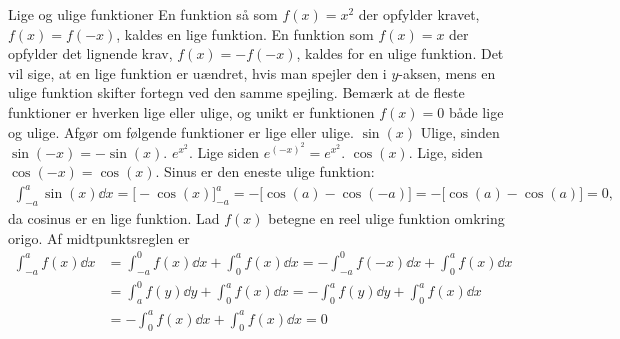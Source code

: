 \begin{opgave}[3]{Lige og ulige funktioner}
En funktion så som $f(x) = x^2$ der opfylder kravet, $f(x) = f(-x)$, kaldes en lige funktion. En funktion som $f(x) = x$ der opfylder det lignende krav, $f(x)=-f(-x)$, kaldes for en ulige funktion.
Det vil sige, at en lige funktion er uændret, hvis man spejler den i $y$-aksen, mens en ulige funktion skifter fortegn ved den samme spejling.
Bemærk at de fleste funktioner er hverken lige eller ulige, og unikt er funktionen $f(x) = 0$ både lige og ulige.
Afgør om følgende funktioner er lige eller ulige.
\opg $\sin(x)$
Ulige, sinden $\sin(-x)=-\sin(x)$.
\opg $e^{x^2}$.
Lige siden $e^{(-x)^2}=e^{x^2}$.
\opg $\cos(x)$.
Lige, siden $\cos(-x)=\cos(x)$.
\opg Sinus er den eneste ulige funktion:
%
\begin{align*}
    \int_{-a}^{a}\sin(x)\dd{x} = \Big[-\cos(x)\Big]_{-a}^{a} = -\Big[\cos(a) - \cos(-a)\Big] = -\Big[\cos(a) - \cos(a)\Big] = 0,
\end{align*}
%
da cosinus er en lige funktion.
\opg Lad $f(x)$ betegne en reel ulige funktion omkring origo. Af midtpunktsreglen er
%
\begin{align*}
    \int_{-a}^{a}f(x)\dd{x} &= \int_{-a}^{0}f(x)\dd{x} + \int_{0}^{a}f(x)\dd{x} = -\int_{-a}^{0}f(-x)\dd{x} + \int_{0}^{a}f(x)\dd{x} \\
    &= \int_{a}^{0}f(y)\dd{y} + \int_{0}^{a}f(x)\dd{x} = -\int_{0}^{a}f(y)\dd{y} + \int_{0}^{a}f(x)\dd{x} \\
    &= -\int_{0}^{a}f(x)\dd{x} + \int_{0}^{a}f(x)\dd{x} = 0
\end{align*}
\end{opgave}

    
